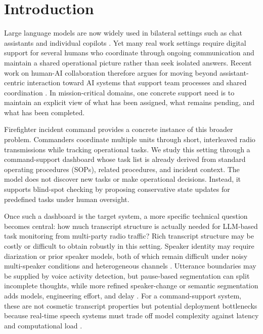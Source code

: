 \section{Introduction}
\label{sec:introduction}

Large language models are now widely used in bilateral settings such as chat assistants and individual copilots \citep{Maedche2019,Nah2023}. Yet many real work settings require digital support for several humans who coordinate through ongoing communication and maintain a shared operational picture rather than seek isolated answers. Recent work on human-AI collaboration therefore argues for moving beyond assistant-centric interaction toward AI systems that support team processes and shared coordination \citep{Seeber2020,Anthony2023,Bankins2024}. In mission-critical domains, one concrete support need is to maintain an explicit view of what has been assigned, what remains pending, and what has been completed.

Firefighter incident command provides a concrete instance of this broader problem. Commanders coordinate multiple units through short, interleaved radio transmissions while tracking operational tasks. We study this setting through a command-support dashboard whose task list is already derived from standard operating procedures (SOPs), related procedures, and incident context. The model does not discover new tasks or make operational decisions. Instead, it supports blind-spot checking by proposing conservative state updates for predefined tasks under human oversight.

Once such a dashboard is the target system, a more specific technical question becomes central: how much transcript structure is actually needed for LLM-based task monitoring from multi-party radio traffic? Rich transcript structure may be costly or difficult to obtain robustly in this setting. Speaker identity may require diarization or prior speaker models, both of which remain difficult under noisy multi-speaker conditions and heterogeneous channels \citep{Mehrish2023A}. Utterance boundaries may be supplied by voice activity detection, but pause-based segmentation can split incomplete thoughts, while more refined speaker-change or semantic segmentation adds models, engineering effort, and delay \citep{Mehrish2023A}. For a command-support system, these are not cosmetic transcript properties but potential deployment bottlenecks because real-time speech systems must trade off model complexity against latency and computational load \citep{Michelsanti2020An}.

